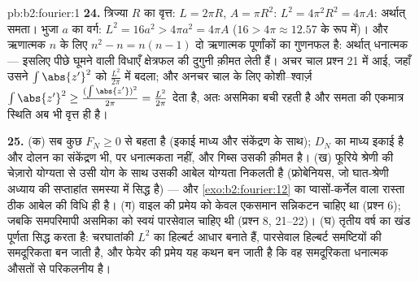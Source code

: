 \begin{solution}{pb:b2:fourier:1}
\textbf{24.} त्रिज्या $R$ का वृत्त: $L = 2\pi R$, $A = \pi
R^2$: $L^2 = 4\pi^2R^2 = 4\pi A$: अर्थात् समता। भुजा $a$
का वर्ग: $L^2 = 16a^2 > 4\pi a^2 = 4\pi A$ ($16 > 4\pi \approx
12.57$ के रूप में)। और ऋणात्मक $n$ के लिए $n^2 - n = n(n - 1)$ दो ऋणात्मक
पूर्णांकों का गुणनफल है: अर्थात् धनात्मक --- इसलिए पीछे घूमने वाली विधाएँ
क्षेत्रफल की दुगुनी क़ीमत लेती हैं। अचर चाल प्रश्न 21 में आई, जहाँ उसने
$\int\abs{z'}^2$ को $\frac{L^2}{2\pi}$ में बदला; और अनचर चाल के लिए कोशी--श्वार्ज़ $\int\abs{z'}^2 \geq
\frac{(\int\abs{z'})^2}{2\pi} = \frac{L^2}{2\pi}$ देता है, अतः
असमिका बची रहती है और समता की एकमात्र स्थिति अब भी वृत्त ही है।

\textbf{25.} (क) सब कुछ $F_N \geq 0$ से बहता है (इकाई माध्य और संकेंद्रण के साथ);
$D_N$ का माध्य इकाई है और दोलन का संकेंद्रण भी, पर धनात्मकता नहीं, और गिब्स
उसकी क़ीमत है। (ख) फूरिये श्रेणी की चेज़ारो योग्यता से उसी योग के साथ उसकी
आबेल योग्यता निकलती है (फ्रोबेनियस, जो घात-श्रेणी अध्याय की सप्ताहांत
समस्या में सिद्ध है) --- और \cref{exo:b2:fourier:12} का प्वासों-कर्नेल वाला रास्ता ठीक आबेल की
विधि ही है। (ग) वाइल की प्रमेय को केवल एकसमान सन्निकटन चाहिए था (प्रश्न
6); जबकि समपरिमापी असमिका को स्वयं पारसेवाल चाहिए थी (प्रश्न 8, 21--22)।
(घ) तृतीय वर्ष का खंड पूर्णता सिद्ध करता है: चरघातांकी $L^2$ का हिल्बर्ट
आधार बनाते हैं, पारसेवाल हिल्बर्ट समष्टियों की समदूरिकता बन जाती है, और
फेयेर की प्रमेय यह कथन बन जाती है कि वह समदूरिकता धनात्मक औसतों से परिकलनीय
है।
\end{solution}

